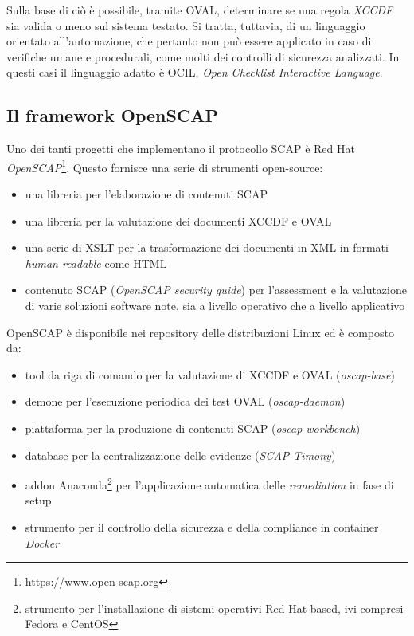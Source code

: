 \documentclass[../main.tex]{subfiles}
\begin{document}
Sulla base di ciò è possibile, tramite OVAL, determinare se una regola \textit{XCCDF} sia valida o meno sul sistema testato. 
Si tratta, tuttavia, di un linguaggio orientato all'automazione, che pertanto non può essere applicato in caso di verifiche umane e procedurali, come molti dei controlli di sicurezza analizzati.
In questi casi il linguaggio adatto è OCIL, \textit{Open Checklist Interactive Language}.

\subsection{Il framework OpenSCAP}
Uno dei tanti progetti che implementano il protocollo SCAP è Red Hat \textit{OpenSCAP}\footnote{https://www.open-scap.org}.
Questo fornisce una serie di strumenti open-source:
\begin{itemize}
    \item una libreria per l'elaborazione di contenuti SCAP
    \item una libreria per la valutazione dei documenti XCCDF e OVAL
    \item una serie di XSLT per la trasformazione dei documenti in XML in formati \textit{human-readable} come HTML
    \item contenuto SCAP (\textit{OpenSCAP security guide}) per l'assessment e la valutazione di varie soluzioni software note, sia a livello operativo che a livello applicativo
\end{itemize}

OpenSCAP è disponibile nei repository delle distribuzioni Linux ed è composto da:
\begin{itemize}
    \item tool da riga di comando per la valutazione di XCCDF e OVAL (\textit{oscap-base})
    \item demone per l'esecuzione periodica dei test OVAL (\textit{oscap-daemon})
    \item piattaforma per la produzione di contenuti SCAP (\textit{oscap-workbench})
    \item database per la centralizzazione delle evidenze (\textit{SCAP Timony})
    \item addon Anaconda\footnote{strumento per l'installazione di sistemi operativi Red Hat-based, ivi compresi Fedora e CentOS} per l'applicazione automatica delle \textit{remediation} in fase di setup
    \item strumento per il controllo della sicurezza e della compliance in container \textit{Docker}
\end{itemize}
\end{document}
